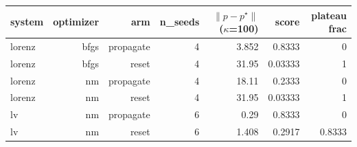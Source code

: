 \begin{tabular}{lrrrrrr}
\toprule
system & optimizer & arm & n\_seeds & $\|p-p^\star\|$ ($\kappa$=100) & score & plateau frac \\
\midrule
lorenz & bfgs & propagate & 4 & 3.852 & 0.8333 & 0 \\
lorenz & bfgs & reset & 4 & 31.95 & 0.03333 & 1 \\
lorenz & nm & propagate & 4 & 18.11 & 0.2333 & 0 \\
lorenz & nm & reset & 4 & 31.95 & 0.03333 & 1 \\
lv & nm & propagate & 6 & 0.29 & 0.8333 & 0 \\
lv & nm & reset & 6 & 1.408 & 0.2917 & 0.8333 \\
\bottomrule
\end{tabular}
